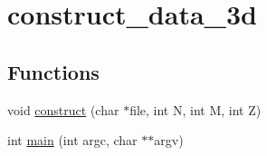 \hypertarget{group__applications__mri3d__construct__data__3d}{
\section{construct\_\-data\_\-3d}
\label{group__applications__mri3d__construct__data__3d}
}
\subsection*{Functions}
\begin{CompactItemize}
\item 
\hypertarget{group__applications__mri3d__construct__data__3d_gd051b24ac19faa5d00ef770bbaca801c}{
void \hyperlink{group__applications__mri3d__construct__data__3d_gd051b24ac19faa5d00ef770bbaca801c}{construct} (char $\ast$file, int N, int M, int Z)}
\label{group__applications__mri3d__construct__data__3d_gd051b24ac19faa5d00ef770bbaca801c}

\item 
\hypertarget{group__applications__mri3d__construct__data__3d_g3c04138a5bfe5d72780bb7e82a18e627}{
int \hyperlink{group__applications__mri3d__construct__data__3d_g3c04138a5bfe5d72780bb7e82a18e627}{main} (int argc, char $\ast$$\ast$argv)}
\label{group__applications__mri3d__construct__data__3d_g3c04138a5bfe5d72780bb7e82a18e627}

\end{CompactItemize}
